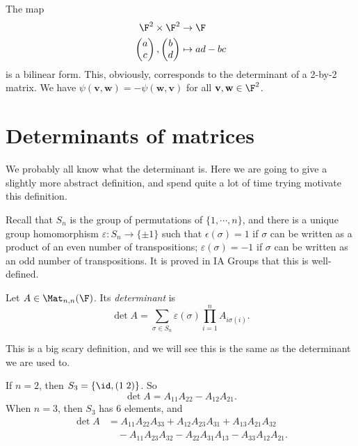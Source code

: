\documentclass[a4paper]{article}
\begin{document}
\begin{eg}
  The map
  \begin{align*}
    \F^2 \times \F^2 &\to \F\\
    \begin{pmatrix}
      a\\c
    \end{pmatrix},
    \begin{pmatrix}
      b\\d
    \end{pmatrix} &\mapsto ad - bc
  \end{align*}
  is a bilinear form. This, obviously, corresponds to the determinant of a 2-by-2 matrix. We have $\psi(\mathbf{v}, \mathbf{w}) = -\psi(\mathbf{w}, \mathbf{v})$ for all $\mathbf{v}, \mathbf{w}\in \F^2$.
\end{eg}

\section{Determinants of matrices}
We probably all know what the determinant is. Here we are going to give a slightly more abstract definition, and spend quite a lot of time trying motivate this definition.

Recall that $S_n$ is the group of permutations of $\{1, \cdots, n\}$, and there is a unique group homomorphism $\varepsilon: S_n \to \{\pm 1\}$ such that $\epsilon(\sigma) = 1$ if $\sigma$ can be written as a product of an even number of transpositions; $\varepsilon(\sigma) = -1$ if $\sigma$ can be written as an odd number of transpositions. It is proved in IA Groups that this is well-defined.

\begin{defi}[Determinant]
  Let $A \in \Mat_{n, n}(\F)$. Its \emph{determinant} is
  \[
    \det A = \sum_{\sigma \in S_n} \varepsilon(\sigma) \prod_{i = 1}^n A_{i \sigma(i)}.
  \]
\end{defi}
This is a big scary definition, and we will see this is the same as the determinant we are used to.

\begin{eg}
  If $n = 2$, then $S_3 = \{\id, (1\; 2)\}$. So
  \[
    \det A = A_{11}A_{22} - A_{12} A_{21}.
  \]
  When $n = 3$, then $S_3$ has 6 elements, and
  \begin{align*}
    \det A &= A_{11}A_{22}A_{33} + A_{12}A_{23}A_{31} + A_{13}A_{21}A_{32}\\
    &\quad - A_{11}A_{23}A_{32} - A_{22}A_{31}A_{13} - A_{33}A_{12}A_{21}.
  \end{align*}
\end{eg}
\end{document}
